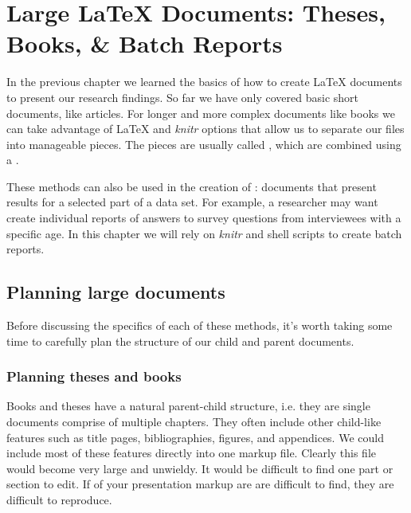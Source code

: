 



\chapter{Large LaTeX Documents: Theses, Books, \& Batch Reports}\label{LargeDocs}

In the previous chapter we learned the basics of how to create LaTeX documents to present our research findings. So far we have only covered basic short documents, like articles. For longer and more complex documents like books we can take advantage of LaTeX and {\emph{knitr}} options that allow us to separate our files into manageable pieces. The pieces are usually called , which are combined using a .

These methods can also be used in the creation of : documents that present results for a selected part of a data set. For example, a researcher may want create individual reports of answers to survey questions from interviewees with a specific age. In this chapter we will rely on {\emph{knitr}} and shell scripts to create batch reports. 

\section{Planning large documents}

Before discussing the specifics of each of these methods, it's worth taking some time to carefully plan the structure of our child and parent documents.

\subsection{Planning theses and books}

Books and theses have a natural parent-child structure, i.e. they are single documents comprise of multiple chapters. They often include other child-like features such as title pages, bibliographies, figures, and appendices. We could include most of these features directly into one markup file. Clearly this file would become very large and unwieldy. It would be difficult to find one part or section to edit. If of your presentation markup are are difficult to find, they are difficult to reproduce.  

